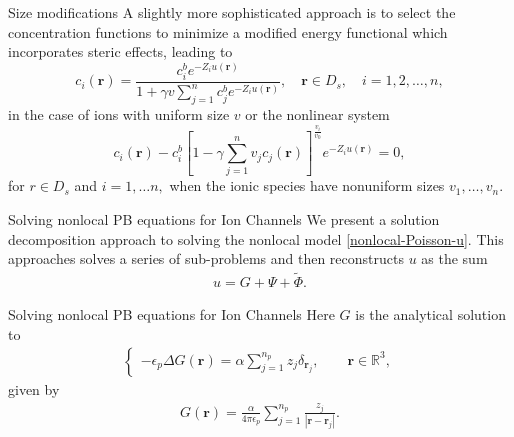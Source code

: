 \documentclass{beamer}
\newcommand{\Phit}{\tilde{\Phi}}
\newcommand{\ep}{\epsilon_p}
\newcommand{\rr}{{\mathbf r}}
\begin{document}
\begin{frame}{Size modifications}
    A slightly more sophisticated approach is to select the concentration functions to minimize a modified energy functional which incorporates steric effects,
    leading to 
    \begin{equation}
 \label{c-selection}
  c_i(\rr) = \frac{c_i^b e^{-Z_{i} u(\rr)} }{1 +  \gamma  v   \sum\limits_{j=1}^n c_j^b e^{-Z_{i} u(\rr)} }, \quad \rr \in D_s, \quad i=1,2,\ldots, n,
\end{equation}
in the case of ions with uniform size $v$ or the nonlinear system 
\begin{equation}\label{size-constraints}
 c_{i}(\rr) - {c}_{i}^b  \left[1-  \gamma  \sum\limits_{j=1}^n  v_j c_j(\rr)  \right]^{\frac{ v_i}{v_0}} e^{-Z_{i} u(\rr)} =0,
\end{equation}
for $r \in D_s$ and $i = 1, \ldots n,$ when the ionic species have nonuniform sizes $v_1,\ldots, v_n.$
\end{frame}
\begin{frame}{Solving nonlocal PB equations for Ion Channels}
    We present a solution decomposition approach to solving the nonlocal model \eqref{nonlocal-Poisson-u}. This approaches solves a series of sub-problems and then reconstructs $u$ as the sum
    \begin{align}
        u = G + \Psi + \Phit.
    \end{align}
\end{frame}
\begin{frame}{Solving nonlocal PB equations for Ion Channels}
    Here $G$ is the analytical solution to 
    \begin{align}
            \begin{cases}
            -\epsilon_p \Delta G(\rr) = \alpha \sum\limits_{j=1}^{n_{p}}z_{j}  \delta_{\rr_{j}}, \qquad \rr \in \mathbb{R}^3,
        \end{cases}
    \end{align}
    given by 
    \begin{align}
        G(\rr) = \frac{\alpha}{4\pi\ep}  \sum\limits_{j=1}^{n_p}\frac{z_{j}}{| \rr-\rr_j |}. 
    \end{align}
\end{frame}
\end{document}

